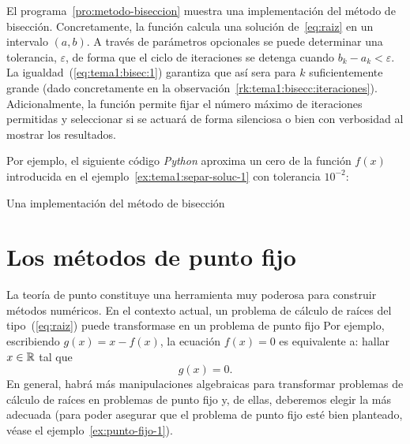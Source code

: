 \begin{test}
  El programa~\ref{pro:metodo-biseccion} muestra una implementación
  del método de bisección. Concretamente, la función
   calcula una solución
  de~\eqref{eq:raiz} en un intervalo $(a,b)$. A través de parámetros
  opcionales se puede determinar una tolerancia, $\varepsilon$, de
  forma que el ciclo de iteraciones se detenga cuando
  $b_k-a_k<\varepsilon$. La igualdad~(\ref{eq:tema1:bisec:1})
  garantiza que así sera para $k$ suficientemente grande (dado
  concretamente en la
  observación~\ref{rk:tema1:bisecc:iteraciones}). Adicionalmente, la
  función permite fijar el número máximo de iteraciones permitidas y
  seleccionar si se actuará de forma silenciosa o bien con
  verbosidad al mostrar los resultados.

  Por ejemplo, el siguiente código \textit{Python} aproxima un cero de
  la función $f(x)$ introducida en el
  ejemplo~\ref{ex:tema1:separ-soluc-1}
  con tolerancia $10^{-2}$:
  \begin{pythonoutput}
  \end{pythonoutput}
\end{test}

\begin{program}
  \caption{Una implementación del método de bisección}
  \label{pro:metodo-biseccion}
\end{program}

\section{Los métodos de punto fijo}
\label{sec:metodos-de-punto-fijo}

La teoría de punto constituye una herramienta muy poderosa para
construir métodos numéricos.  En el contexto actual, un problema de
cálculo de raíces del tipo~(\ref{eq:raiz}) puede transformase en un
problema de punto fijo Por ejemplo, escribiendo $g(x)=x-f(x)$,
la ecuación $f(x)=0$ es equivalente a: hallar $x\in\operatorname{{\mathbb R}}$ tal que
$$
g(x)=0.
$$
En general, habrá más manipulaciones algebraicas para transformar
problemas de cálculo de raíces en problemas de punto fijo y, de
ellas, deberemos elegir la más adecuada (para poder asegurar que el
problema de punto fijo esté bien planteado, véase el
ejemplo~\ref{ex:punto-fijo-1}).

